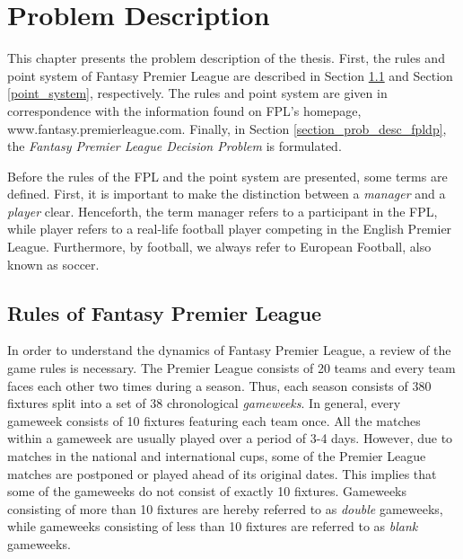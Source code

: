 
\chapter{Problem Description} \label{chapter_problem_description}

This chapter presents the problem description of the thesis. First, the rules and point system of Fantasy Premier League are described in Section \ref{rules of fpl} and Section \ref{point_system}, respectively. The rules and point system are given in correspondence with the information found on FPL's homepage, www.fantasy.premierleague.com. Finally, in Section \ref{section_prob_desc_fpldp}, the \textit{Fantasy Premier League Decision Problem} is formulated. 


\newpar

Before the rules of the FPL and the point system are presented, some terms are defined. First, it is important to make the distinction between a \textit{manager} and a \textit{player} clear. Henceforth, the term manager refers to a participant in the FPL, while player refers to a real-life football player competing in the English Premier League. Furthermore, by football, we always refer to European Football, also known as soccer.


\section{Rules of Fantasy Premier League} \label{rules of fpl}


In order to understand the dynamics of Fantasy Premier League, a review of the game rules is necessary. The Premier League consists of 20 teams and every team faces each other two times during a season. Thus, each season consists of 380 fixtures split into a set of 38 chronological \textit{gameweeks}. In general, every gameweek consists of 10 fixtures featuring each team once. All the matches within a gameweek are usually played over a period of 3-4 days. However, due to matches in the national and international cups, some of the Premier League matches are postponed or played ahead of its original dates. This implies that some of the gameweeks do not consist of exactly 10 fixtures. Gameweeks consisting of more than 10 fixtures are hereby referred to as \textit{double} gameweeks, while gameweeks consisting of less than 10 fixtures are referred to as \textit{blank} gameweeks.


